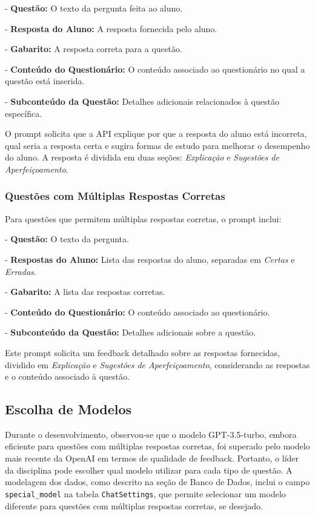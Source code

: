 - \textbf{Questão:} O texto da pergunta feita ao aluno.

- \textbf{Resposta do Aluno:} A resposta fornecida pelo aluno.

- \textbf{Gabarito:} A resposta correta para a questão.

- \textbf{Conteúdo do Questionário:} O conteúdo associado ao questionário no qual a questão está inserida.

- \textbf{Subconteúdo da Questão:} Detalhes adicionais relacionados à questão específica.

O prompt solicita que a API explique por que a resposta do aluno está incorreta, qual seria a resposta certa e sugira formas de estudo para melhorar o desempenho do aluno. A resposta é dividida em duas seções: \textit{Explicação} e \textit{Sugestões de Aperfeiçoamento}.

\subsubsection{Questões com Múltiplas Respostas Corretas}

Para questões que permitem múltiplas respostas corretas, o prompt inclui:

- \textbf{Questão:} O texto da pergunta.

- \textbf{Respostas do Aluno:} Lista das respostas do aluno, separadas em \textit{Certas} e \textit{Erradas}.

- \textbf{Gabarito:} A lista das respostas corretas.

- \textbf{Conteúdo do Questionário:} O conteúdo associado ao questionário.

- \textbf{Subconteúdo da Questão:} Detalhes adicionais sobre a questão.

Este prompt solicita um feedback detalhado sobre as respostas fornecidas, dividido em \textit{Explicação} e \textit{Sugestões de Aperfeiçoamento}, considerando as respostas e o conteúdo associado à questão.

\subsection{Escolha de Modelos}

Durante o desenvolvimento, observou-se que o modelo GPT-3.5-turbo, embora eficiente para questões com múltiplas respostas corretas, foi superado pelo modelo mais recente da OpenAI em termos de qualidade de feedback. Portanto, o líder da disciplina pode escolher qual modelo utilizar para cada tipo de questão. A modelagem dos dados, como descrito na seção de Banco de Dados, inclui o campo \texttt{special\_model} na tabela \texttt{ChatSettings}, que permite selecionar um modelo diferente para questões com múltiplas respostas corretas, se desejado.

